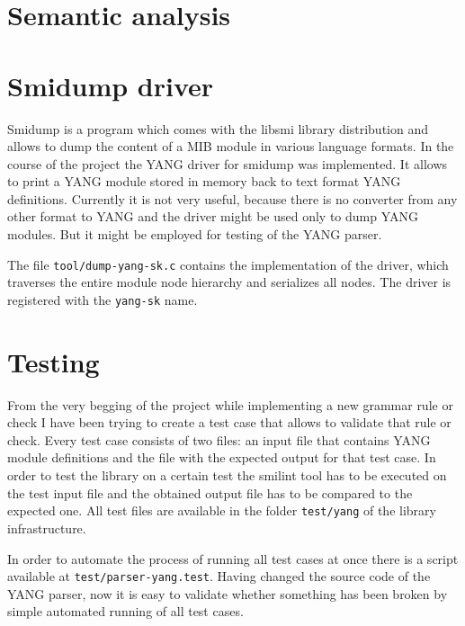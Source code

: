 \documentclass[conference]{IEEEtran}
\begin{document}
\section{Semantic analysis}

\section{Smidump driver}
Smidump is a program which comes with the libsmi library distribution and allows to dump the content of a MIB module in various language formats. In the course of the project the YANG driver for smidump was implemented. It allows to print a YANG module stored in memory back to text format YANG definitions. Currently it is not very useful, because there is no converter from any other format to YANG and the driver might be used only to dump YANG modules. But it might be employed for testing of the YANG parser.

The file \texttt{tool/dump-yang-sk.c} contains the implementation of the driver, which traverses the entire module node hierarchy and serializes all nodes. The driver is registered with the \texttt{yang-sk} name.

\section{Testing}
From the very begging of the project  while implementing a new grammar rule or check I have been trying to create a test case that allows to validate that rule or check. Every test case consists of two files: an input file that contains YANG module definitions and the file with the expected output for that test case. In order to test the library on a certain test the smilint tool has to be executed on the test input file and the obtained output file has to be compared to the expected one. All test files are available in the folder 	\texttt{test/yang} of the library infrastructure.

In order to automate the process of running all test cases at once there is a script available at \texttt{test/parser-yang.test}. Having changed the source code of the YANG parser, now it is easy to validate whether something has been broken by simple automated running of all test cases.
\end{document}
